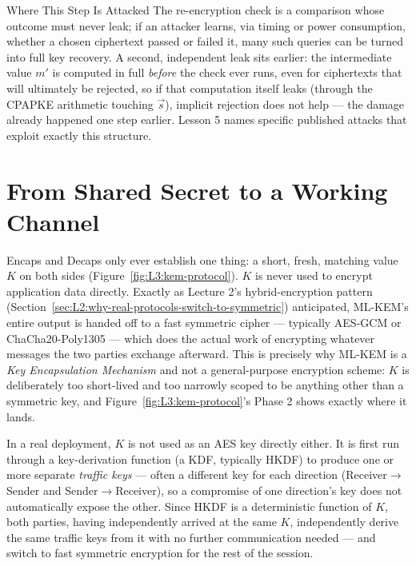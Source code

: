 \begin{rmkbox}{Where This Step Is Attacked}
The re-encryption check is a comparison whose outcome must never leak; if an attacker learns, via timing or power consumption, whether a chosen ciphertext passed or failed it, many such queries can be turned into full key recovery. A second, independent leak sits earlier: the intermediate value $m'$ is computed in full \emph{before} the check ever runs, even for ciphertexts that will ultimately be rejected, so if that computation itself leaks (through the CPAPKE arithmetic touching $\vec s$), implicit rejection does not help --- the damage already happened one step earlier. Lesson 5 names specific published attacks that exploit exactly this structure.
\end{rmkbox}

\section{From Shared Secret to a Working Channel}
\label{sec:L3:from-shared-secret-to-a-working-channel}

Encaps and Decaps only ever establish one thing: a short, fresh, matching value $K$ on both sides (Figure~\ref{fig:L3:kem-protocol}). $K$ is never used to encrypt application data directly. Exactly as Lecture 2's hybrid-encryption pattern (Section~\ref{sec:L2:why-real-protocols-switch-to-symmetric}) anticipated, ML-KEM's entire output is handed off to a fast symmetric cipher --- typically AES-GCM or ChaCha20-Poly1305 --- which does the actual work of encrypting whatever messages the two parties exchange afterward. This is precisely why ML-KEM is a \emph{Key Encapsulation Mechanism} and not a general-purpose encryption scheme: $K$ is deliberately too short-lived and too narrowly scoped to be anything other than a symmetric key, and Figure~\ref{fig:L3:kem-protocol}'s Phase 2 shows exactly where it lands.

In a real deployment, $K$ is not used as an AES key directly either. It is first run through a key-derivation function (a KDF, typically HKDF) to produce one or more separate \emph{traffic keys} --- often a different key for each direction (Receiver$\to$Sender and Sender$\to$Receiver), so a compromise of one direction's key does not automatically expose the other. Since HKDF is a deterministic function of $K$, both parties, having independently arrived at the same $K$, independently derive the same traffic keys from it with no further communication needed --- and switch to fast symmetric encryption for the rest of the session.

